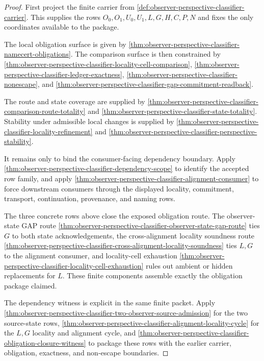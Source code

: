 \begin{proof}
First project the finite carrier from \autoref{def:observer-perspective-classifier-carrier}. This supplies the rows $O_0,O_1,U_0,U_1,L,G,H,C,P,N$ and fixes the only coordinates available to the package.

The local obligation surface is given by \autoref{thm:observer-perspective-classifier-namecert-obligations}. The comparison surface is then constrained by \autoref{thm:observer-perspective-classifier-locality-cell-comparison}, \autoref{thm:observer-perspective-classifier-ledger-exactness}, \autoref{thm:observer-perspective-classifier-nonescape}, and \autoref{thm:observer-perspective-classifier-gap-commitment-readback}.

The route and state coverage are supplied by \autoref{thm:observer-perspective-classifier-comparison-route-totality} and \autoref{thm:observer-perspective-classifier-state-totality}. Stability under admissible local changes is supplied by \autoref{thm:observer-perspective-classifier-locality-refinement} and \autoref{thm:observer-perspective-classifier-perspective-stability}.

It remains only to bind the consumer-facing dependency boundary. Apply \autoref{thm:observer-perspective-classifier-dependency-scope} to identify the accepted row family, and apply \autoref{thm:observer-perspective-classifier-alignment-consumer} to force downstream consumers through the displayed locality, commitment, transport, continuation, provenance, and naming rows.

The three concrete rows above close the exposed obligation route. The observer-state GAP route \autoref{thm:observer-perspective-classifier-observer-state-gap-route} ties $G$ to both state acknowledgements, the cross-alignment locality soundness route \autoref{thm:observer-perspective-classifier-cross-alignment-locality-soundness} ties $L,G$ to the alignment consumer, and locality-cell exhaustion \autoref{thm:observer-perspective-classifier-locality-cell-exhaustion} rules out ambient or hidden replacements for $L$. These finite components assemble exactly the obligation package claimed.

The dependency witness is explicit in the same finite packet. Apply \autoref{thm:observer-perspective-classifier-two-observer-source-admission} for the two source-state rows, \autoref{thm:observer-perspective-classifier-alignment-locality-cycle} for the $L,G$ locality and alignment cycle, and \autoref{thm:observer-perspective-classifier-obligation-closure-witness} to package these rows with the earlier carrier, obligation, exactness, and non-escape boundaries.
\end{proof}

